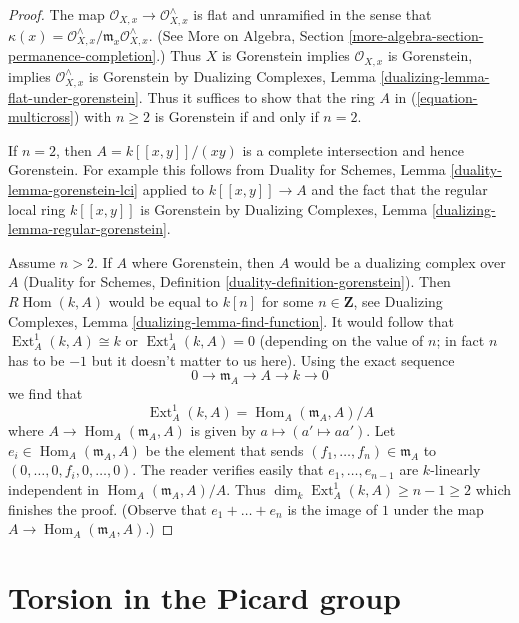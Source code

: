 \documentclass{stacks-project}
\theoremstyle{plain}
\theoremstyle{definition}
\theoremstyle{remark}
\numberwithin{equation}{subsection}
\def\Hom{\mathop{\mathrm{Hom}}\nolimits}
\def\Ext{\mathop{\mathrm{Ext}}\nolimits}
\begin{document}
\begin{proof}
The map $\mathcal{O}_{X, x} \to \mathcal{O}_{X, x}^\wedge$
is flat and unramified in the sense that
$\kappa(x) = \mathcal{O}_{X, x}^\wedge/\mathfrak m_x \mathcal{O}_{X, x}^\wedge$.
(See More on Algebra, Section \ref{more-algebra-section-permanence-completion}.)
Thus $X$ is Gorenstein implies $\mathcal{O}_{X, x}$ is Gorenstein, implies
$\mathcal{O}_{X, x}^\wedge$ is Gorenstein by
Dualizing Complexes, Lemma \ref{dualizing-lemma-flat-under-gorenstein}.
Thus it suffices to show that the ring $A$ in
(\ref{equation-multicross}) with $n \geq 2$
is Gorenstein if and only if $n = 2$.

\medskip\noindent
If $n = 2$, then $A = k[[x, y]]/(xy)$ is a complete intersection
and hence Gorenstein. For example this follows from
Duality for Schemes, Lemma \ref{duality-lemma-gorenstein-lci}
applied to $k[[x, y]] \to A$ and the fact that the regular
local ring $k[[x, y]]$ is Gorenstein by
Dualizing Complexes, Lemma \ref{dualizing-lemma-regular-gorenstein}.

\medskip\noindent
Assume $n > 2$. If $A$ where Gorenstein, then $A$ would be a
dualizing complex over $A$
(Duality for Schemes, Definition \ref{duality-definition-gorenstein}).
Then $R\Hom(k, A)$ would be equal to $k[n]$ for some $n \in \mathbf{Z}$, see
Dualizing Complexes, Lemma \ref{dualizing-lemma-find-function}.
It would follow that $\Ext^1_A(k, A) \cong k$
or $\Ext^1_A(k, A) = 0$ (depending on the value of $n$;
in fact $n$ has to be $-1$ but it doesn't matter to us here).
Using the exact sequence
$$
0 \to \mathfrak m_A \to A \to k \to 0
$$
we find that
$$
\Ext^1_A(k, A) = \Hom_A(\mathfrak m_A, A)/A
$$
where $A \to \Hom_A(\mathfrak m_A, A)$ is given by
$a \mapsto (a' \mapsto aa')$. Let $e_i \in \Hom_A(\mathfrak m_A, A)$
be the element that sends $(f_1, \ldots, f_n) \in \mathfrak m_A$ to
$(0, \ldots, 0, f_i, 0, \ldots, 0)$. The reader verifies easily
that $e_1, \ldots, e_{n - 1}$ are $k$-linearly independent in
$\Hom_A(\mathfrak m_A, A)/A$. Thus
$\dim_k \Ext^1_A(k, A) \geq n - 1 \geq 2$ which
finishes the proof.
(Observe that $e_1 + \ldots + e_n$ is the image of $1$ under the map
$A \to \Hom_A(\mathfrak m_A, A)$.)
\end{proof}




\section{Torsion in the Picard group}
\label{section-torsion-in-pic}
\end{document}
